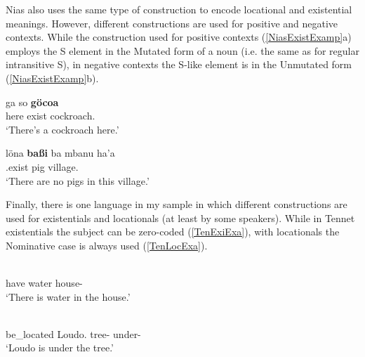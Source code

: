 Nias also uses the same type of construction to encode locational and existential meanings. 
However, different constructions are used for positive and negative contexts.
While the construction used for positive contexts (\ref{NiasExistExamp}a) employs the S element in the Mutated form of a noun (i.e. the same as for regular intransitive S), in negative contexts the S-like element is in the Unmutated form (\ref{NiasExistExamp}b).

\begin{exe} \ex\label{NiasExistExamp}
\begin{xlist} \ex \gll ga so \textbf{g\"ocoa}\\
here exist cockroach.\mut{}\\
\glt `There's a cockroach here.'

\ex \gll l\"ona \textbf{ba{\ss}i} ba mbanu ha'a\\
\Neg{}.exist pig \loc{} village.\mut{} \prox{}\\
\glt `There are no pigs in this village.'
\end{xlist} 
\end{exe}

Finally, there is one language in my sample in which different constructions are used for existentials and locationals (at least by some speakers).
While in Tennet existentials the subject can be zero-coded (\ref{TenExiExa}), with locationals the Nominative case is always used (\ref{TenLocExa}).

\begin{exe} \ex{}
 \begin{xlist}
\ex\label{TenExiExa}\gll{} \textbf{} \\
have water house-\obl{}\\
\glt `There is water in the house.' 

\ex\label{TenLocExa}\gll{} \textbf{}  \\
be\_located Loudo.\nom{} tree-\obl{} under-\obl{}\\
\glt `Loudo is under the tree.'
\end{xlist}
\end{exe}

